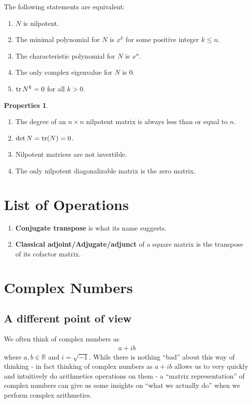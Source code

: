 \documentclass{book}
\theoremstyle{definition}
\newtheorem{prop}{Properties}[section]
\newcommand{\R}{\mathbb{R}}
\begin{document}
\begin{enumerate}
	The following statements are equivalent:
	\begin{enumerate} 
		\item $N$ is nilpotent.
		\item The minimal polynomial for $N$ is $x^k$ for some positive integer $k\leq n$.
		\item The characteristic polynomial for $N$ is $x^n$.
		\item The only complex eigenvalue for $N$ is 0.
		\item $\tr N^k = 0$ for all $k > 0$.
	\end{enumerate}
	\begin{prop}
		$\,$
		\begin{enumerate}
			\item The degree of an $n\times n$ nilpotent matrix is always less than or equal to $n$. 
			\item $\det N = \tr(N) = 0$.
			\item Nilpotent matrices are not invertible.
			\item The only nilpotent diagonalizable matrix is the zero matrix. 
		\end{enumerate}
	\end{prop}
\end{enumerate}

\newpage
\chapter{List of Operations}
\begin{enumerate}
	\item \textbf{Conjugate transpose} is what its name suggests.
	\item \textbf{Classical adjoint/Adjugate/adjunct} of a square matrix is the transpose of its cofactor matrix. 
\end{enumerate}
\newpage


\chapter{Complex Numbers}
\section{A different point of view}
We often think of complex numbers as
\begin{align*}
a + ib
\end{align*}
where $a,b \in \R$ and $i = \sqrt{-1}$. While there is nothing ``bad'' about this way of thinking - in fact thinking of complex numbers as $a+ib$ allows us to very quickly and intuitively do arithmetics operations on them - a ``matrix representation'' of complex numbers can give us some insights on ``what we actually do'' when we perform complex arithmetics.\\
\end{document}
